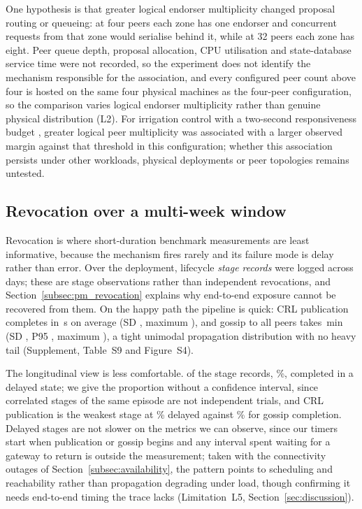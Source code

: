 \documentclass[a4paper,fleqn]{cas-sc}
\begin{document}
One hypothesis is that greater logical endorser multiplicity changed
proposal routing or queueing: at four peers each zone has one endorser and
concurrent requests from that zone would serialise behind it, while at 32
peers each zone has eight. Peer queue depth, proposal allocation, CPU
utilisation and state-database service time were not recorded, so the
experiment does not identify the mechanism responsible for the
association, and every configured peer count above four is hosted on the
same four physical machines as the four-peer configuration, so the
comparison varies logical endorser multiplicity rather than genuine
physical distribution (L2). For irrigation control with a two-second
responsiveness budget \cite{leacox2013wireless}, greater logical peer
multiplicity was associated with a larger observed margin against that
threshold in this configuration; whether this association persists under
other workloads, physical deployments or peer topologies remains
untested.

\subsection{Revocation over a multi-week window}
\label{subsec:revocation}

Revocation is where short-duration benchmark measurements are least
informative, because the mechanism fires rarely and its failure mode is
delay rather than error.
Over the deployment, \RevEvents{} lifecycle \emph{stage records} were
logged across \RevDays{} days; these are stage observations rather than
independent revocations, and Section~\ref{subsec:pm_revocation} explains
why end-to-end exposure cannot be recovered from them. On the happy path
the pipeline is quick: CRL publication completes in \RevPubMean\,s on
average (SD \RevPubSD, maximum \RevPubMax), and gossip to all peers takes
\RevGossipMean\,min (SD \RevGossipSD, P95 \RevGossipPNinetyFive, maximum
\RevGossipMax), a tight unimodal propagation distribution with no heavy
tail (Supplement, Table~S9 and Figure~S4).

The longitudinal view is less comfortable. \RevDelayed{} of the
\RevEvents{} stage records, \RevDelayedPct\%, completed in a delayed
state; we give the proportion without a confidence interval, since
correlated stages of the same episode are not independent trials, and CRL
publication is the weakest stage at \RevWorstTypePct\% delayed against
\RevBestTypePct\% for gossip completion. Delayed stages are not slower on
the metrics we can observe, since our timers start when publication or
gossip begins and any interval spent waiting for a gateway to return is
outside the measurement; taken with the connectivity outages of
Section~\ref{subsec:availability}, the pattern points to scheduling and
reachability rather than propagation degrading under load, though
confirming it needs end-to-end timing the trace lacks (Limitation~L5,
Section~\ref{sec:discussion}).
\end{document}
